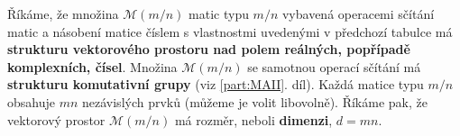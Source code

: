       \begin{table*}[ht!]
        \centering
        \caption{Přehled operací s maticemi}
        \label{mai:tab003}
      \end{table*}
      Říkáme, že množina \(\mathcal{M}(m/n)\) matic typu \(m/n\) vybavená operacemi sčítání matic a 
      násobení matice číslem s vlastnostmi uvedenými v předchozí tabulce má \textbf{strukturu 
      vektorového prostoru nad polem reálných, popřípadě komplexních, čísel}. Množina 
      \(\mathcal{M}(m/n)\) se samotnou operací sčítání má \textbf{strukturu komutativní grupy} (viz 
      \ref{part:MAII}. díl). Každá matice typu \(m/n\) obsahuje \(mn\) nezávislých prvků (můžeme je 
      volit libovolně). Říkáme pak, že vektorový prostor \(\mathcal{M}(m/n)\) má rozměr, neboli 
      \textbf{dimenzi}, \(d = mn\).
      

